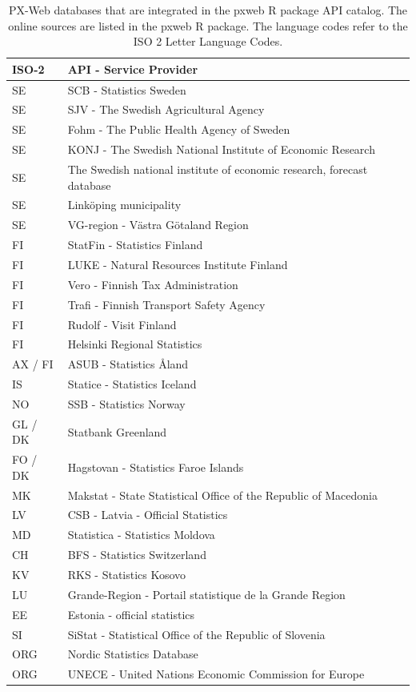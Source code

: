 \begin{table}[ht]
\centering
\begin{tabular}{lll}
% 
\toprule
ISO-2 & API - Service Provider \\
\hline
SE & SCB - Statistics Sweden \\
SE & SJV - The Swedish Agricultural Agency \\
SE & Fohm - The Public Health Agency of Sweden \\
SE & KONJ - The Swedish National Institute of Economic Research \\
SE & The Swedish national institute of economic research, forecast database \\
SE & Linköping municipality \\
SE & VG-region - Västra Götaland Region \\
FI & StatFin - Statistics Finland \\
FI & LUKE - Natural Resources Institute Finland \\
FI & Vero - Finnish Tax Administration \\
FI & Trafi - Finnish Transport Safety Agency \\
FI & Rudolf - Visit Finland \\
FI & Helsinki Regional Statistics \\
AX / FI & ASUB - Statistics Åland \\
IS & Statice - Statistics Iceland \\
NO & SSB - Statistics Norway \\
GL / DK & Statbank Greenland \\
FO / DK & Hagstovan - Statistics Faroe Islands \\
MK & Makstat - State Statistical Office of the Republic of Macedonia \\
LV & CSB - Latvia - Official Statistics \\
MD & Statistica - Statistics Moldova \\
CH & BFS - Statistics Switzerland \\
KV & RKS - Statistics Kosovo \\
LU & Grande-Region - Portail statistique de la Grande Region \\
EE & Estonia - official statistics \\
SI & SiStat - Statistical Office of the Republic of Slovenia \\
\hline
ORG & Nordic Statistics Database \\
ORG & UNECE - United Nations Economic Commission for Europe \\
\bottomrule
\end{tabular}
\caption{\label{tab:databases}PX-Web databases that are integrated in the pxweb R package API catalog. The online sources are listed in the pxweb R package. The language codes refer to the ISO 2 Letter Language Codes.}
\end{table}

